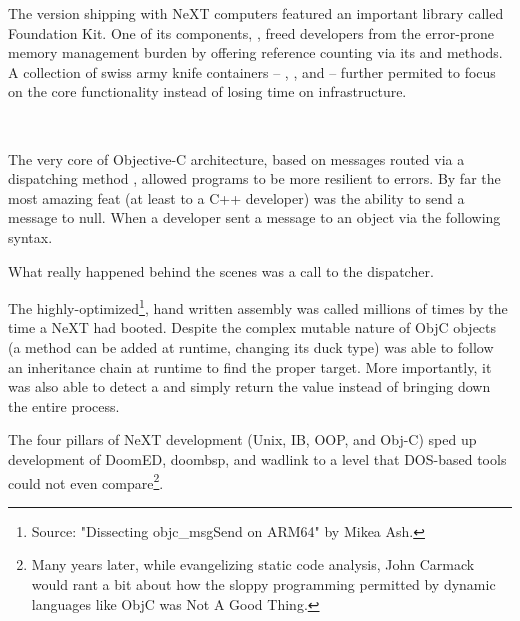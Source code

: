 \par
\vspace{-5pt}
The version shipping with NeXT computers featured an important library called Foundation Kit. One of its components, , freed developers from the error-prone memory management burden by offering reference counting via its  and  methods. A collection of swiss army knife containers -- , ,  and  -- further permited to focus on the core functionality instead of losing time on infrastructure.\\
\par
{}\\
\par
The very core of Objective-C architecture, based on messages routed via a dispatching method , allowed programs to be more resilient to errors. By far the most amazing feat (at least to a C++ developer) was the ability to send a message to null. When a developer sent a message to an object via the following syntax.\\ \par
{}
What really happened behind the scenes was a call to the dispatcher.\\
\par
{}
The highly-optimized\footnote{Source: "Dissecting objc\_msgSend on ARM64" by Mikea Ash.}, hand written assembly was called millions of times by the time a NeXT had booted. Despite the complex mutable nature of ObjC objects (a method can be added at runtime, changing its duck type)  was able to follow an inheritance chain at runtime to find the proper target. More importantly, it was also able to detect a  and simply return the value  instead of bringing down the entire process.\\
\par

The four pillars of NeXT development (Unix, IB, OOP, and Obj-C) sped up development of DoomED, doombsp, and wadlink to a level that DOS-based tools could not even compare\footnote{Many years later, while evangelizing static code analysis, John Carmack would rant a bit about how the sloppy programming permitted by dynamic languages like ObjC was Not A Good Thing.}.

